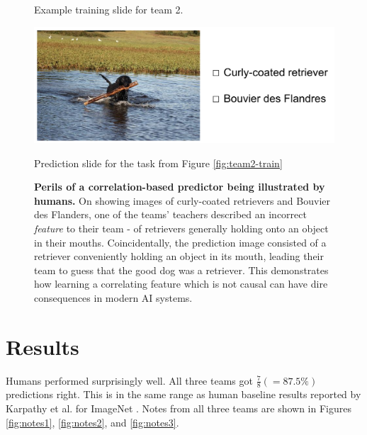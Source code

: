 \documentclass[sigplan,10pt]{acmart}
\begin{document}
\begin{figure}[!h]
    \caption{Example training slide for team 2.}
    \label{fig:team2-train}
\endminipage\hfill
{}%
    \includegraphics[width=1.2\textwidth]{images/ex1-test.png}
    \caption{Prediction slide for the task from Figure \ref{fig:team2-train}}
    \label{fig:team2-test}
\endminipage
\caption{\textbf{Perils of a correlation-based predictor being illustrated by humans.} On showing images of curly-coated retrievers and Bouvier des Flanders, one of the teams' teachers described an incorrect \textit{feature} to their team - of retrievers generally holding onto an object in their mouths. Coincidentally, the prediction image consisted of a retriever conveniently holding an object in its mouth, leading their team to guess that the good dog was a retriever. This demonstrates how learning a correlating feature which is not causal can have dire consequences in modern AI systems.}
\end{figure}


\section{Results}

Humans performed surprisingly well. All three teams got $\frac{7}{8} (=87.5\%)$ predictions right. This is in the same range as human baseline results reported by Karpathy et al. for ImageNet \cite{karpathy}. Notes from all three teams are shown in Figures \ref{fig:notes1}, \ref{fig:notes2}, and \ref{fig:notes3}. 
\end{document}
